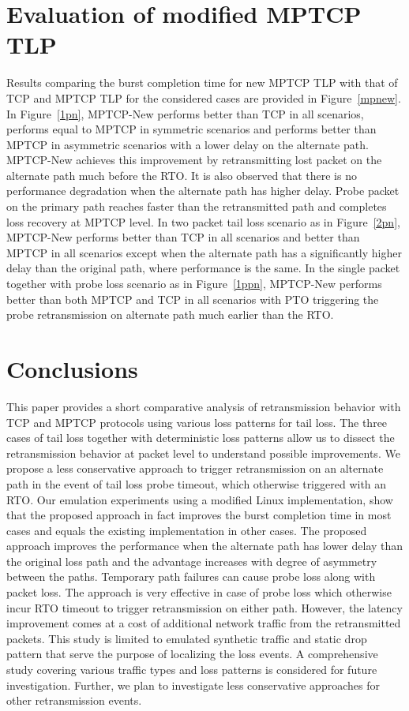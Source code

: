 \documentclass[10pt,conference]{IEEEtran}
\begin{document}
\section{Evaluation of modified MPTCP TLP}\label{eval}

Results comparing the burst completion time for new MPTCP TLP with that of TCP and MPTCP TLP for the considered cases are provided in 
Figure~\ref{mpnew}. In Figure~\ref{1pn}, MPTCP-New performs better than TCP in all scenarios, performs equal to MPTCP in symmetric scenarios and 
performs better than MPTCP in asymmetric scenarios with a lower delay on the alternate path. MPTCP-New achieves this improvement by retransmitting
 lost packet on the alternate path much before the RTO. It is also observed that there is no performance degradation when the alternate path has 
 higher delay. Probe packet on the primary path reaches faster than the retransmitted path and completes loss recovery at MPTCP level. In two packet 
 tail loss scenario as in Figure~\ref{2pn}, MPTCP-New performs better than TCP in all scenarios and better than MPTCP in all scenarios except when 
 the alternate path has a significantly higher delay than the original path, where performance is the same. In the single packet together with probe 
 loss scenario as in Figure~\ref{1ppn}, MPTCP-New performs better than both MPTCP and TCP in all scenarios with PTO triggering the probe retransmission
 on alternate path much earlier than the RTO. 


\section{Conclusions}\label{conc}
This paper provides a short comparative analysis of retransmission behavior with TCP and MPTCP protocols using various loss patterns for tail loss.
The three cases of tail loss together with deterministic loss patterns allow us to dissect the retransmission behavior at packet level to 
understand possible improvements.
We propose a less conservative approach to trigger retransmission on an alternate path in the event of tail loss probe timeout, which otherwise 
triggered with an RTO. Our emulation experiments  using a modified Linux implementation, show that the proposed approach in fact improves the 
burst completion time in most cases and equals the existing implementation in other cases. The proposed approach improves the performance when 
the alternate path has lower delay than the original loss path and the advantage increases with degree of asymmetry between the paths. 
Temporary path failures can cause probe loss along with packet loss. The approach is very effective in case of probe loss which otherwise 
incur RTO timeout to trigger retransmission on either path. However, the latency improvement comes at a cost of additional network traffic 
from the retransmitted packets. This study is limited to emulated synthetic traffic and static drop pattern that serve the purpose of localizing 
the loss events. A comprehensive study covering various traffic types and loss patterns is considered for future investigation. Further, we plan 
to investigate less conservative approaches for other retransmission events.
\end{document}
